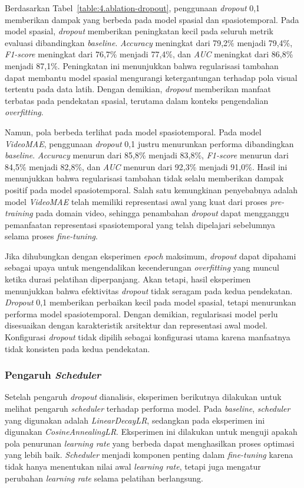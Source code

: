 Berdasarkan Tabel~\ref{table:4.ablation-dropout}, penggunaan \textit{dropout} 0,1 memberikan dampak yang berbeda pada model spasial dan spasiotemporal. Pada model spasial, \textit{dropout} memberikan peningkatan kecil pada seluruh metrik evaluasi dibandingkan \textit{baseline}. \textit{Accuracy} meningkat dari 79,2\% menjadi 79,4\%, \textit{F1-score} meningkat dari 76,7\% menjadi 77,4\%, dan \textit{AUC} meningkat dari 86,8\% menjadi 87,1\%. Peningkatan ini menunjukkan bahwa regularisasi tambahan dapat membantu model spasial mengurangi ketergantungan terhadap pola visual tertentu pada data latih. Dengan demikian, \textit{dropout} memberikan manfaat terbatas pada pendekatan spasial, terutama dalam konteks pengendalian \textit{overfitting}.

Namun, pola berbeda terlihat pada model spasiotemporal. Pada model \textit{VideoMAE}, penggunaan \textit{dropout} 0,1 justru menurunkan performa dibandingkan \textit{baseline}. \textit{Accuracy} menurun dari 85,8\% menjadi 83,8\%, \textit{F1-score} menurun dari 84,5\% menjadi 82,8\%, dan \textit{AUC} menurun dari 92,3\% menjadi 91,0\%. Hasil ini menunjukkan bahwa regularisasi tambahan tidak selalu memberikan dampak positif pada model spasiotemporal. Salah satu kemungkinan penyebabnya adalah model \textit{VideoMAE} telah memiliki representasi awal yang kuat dari proses \textit{pre-training} pada domain video, sehingga penambahan \textit{dropout} dapat mengganggu pemanfaatan representasi spasiotemporal yang telah dipelajari sebelumnya selama proses \textit{fine-tuning}.

Jika dihubungkan dengan eksperimen \textit{epoch} maksimum, \textit{dropout} dapat dipahami sebagai upaya untuk mengendalikan kecenderungan \textit{overfitting} yang muncul ketika durasi pelatihan diperpanjang. Akan tetapi, hasil eksperimen menunjukkan bahwa efektivitas \textit{dropout} tidak seragam pada kedua pendekatan. \textit{Dropout} 0,1 memberikan perbaikan kecil pada model spasial, tetapi menurunkan performa model spasiotemporal. Dengan demikian, regularisasi model perlu disesuaikan dengan karakteristik arsitektur dan representasi awal model. Konfigurasi \textit{dropout} tidak dipilih sebagai konfigurasi utama karena manfaatnya tidak konsisten pada kedua pendekatan.

\subsubsection{Pengaruh \textit{Scheduler}} \label{IV.Eksperimen_Ablation_Scheduler}
Setelah pengaruh \textit{dropout} dianalisis, eksperimen berikutnya dilakukan untuk melihat pengaruh \textit{scheduler} terhadap performa model. Pada \textit{baseline}, \textit{scheduler} yang digunakan adalah \textit{LinearDecayLR}, sedangkan pada eksperimen ini digunakan \textit{CosineAnnealingLR}. Eksperimen ini dilakukan untuk menguji apakah pola penurunan \textit{learning rate} yang berbeda dapat menghasilkan proses optimasi yang lebih baik. \textit{Scheduler} menjadi komponen penting dalam \textit{fine-tuning} karena tidak hanya menentukan nilai awal \textit{learning rate}, tetapi juga mengatur perubahan \textit{learning rate} selama pelatihan berlangsung.

